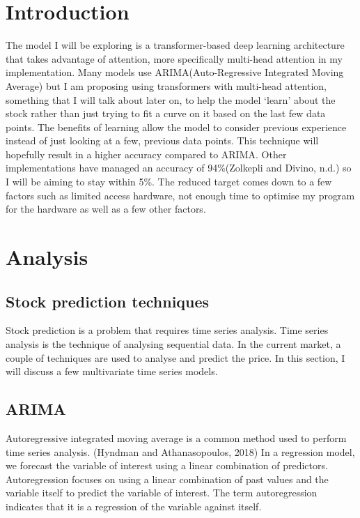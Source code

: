 \documentclass{article}
\begin{document}
\section{Introduction}
The model I will be exploring is a transformer-based deep learning architecture that takes advantage of attention, more specifically multi-head attention in my implementation.
Many models use ARIMA(Auto-Regressive Integrated Moving Average) but I am proposing using transformers with multi-head attention, something that I will talk about later on, to help the model ‘learn’ about the stock rather than just trying to fit a curve on it based on the last few data points. The benefits of learning allow the model to consider previous experience instead of just looking at a few, previous data points. This technique will hopefully result in a higher accuracy compared to ARIMA. Other implementations have managed an accuracy of 94\%(Zolkepli and Divino, n.d.) so I will be aiming to stay within 5\%. The reduced target comes down to a few factors such as limited access hardware, not enough time to optimise my program for the hardware as well as a few other factors.



\section{Analysis}
\subsection{Stock prediction techniques}
Stock prediction is a problem that requires time series analysis. Time series analysis is the technique of analysing sequential data.
In the current market, a couple of techniques are used to analyse and predict the price. In this section, I will discuss a few multivariate time series models.

\subsection{ARIMA}
Autoregressive integrated moving average is a common method used to perform time series analysis.
(Hyndman and Athanasopoulos, 2018)
In a regression model, we forecast the variable of interest using a linear combination of predictors. Autoregression focuses on using a linear combination of past values and the variable itself to predict the variable of interest. The term autoregression indicates that it is a regression of the variable against itself.
\end{document}
